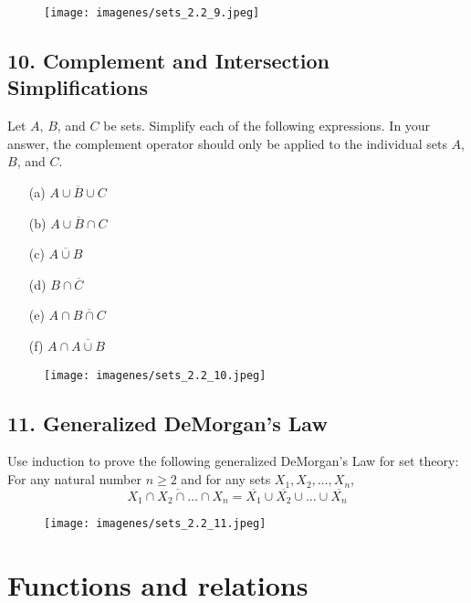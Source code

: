 \documentclass{article}
\begin{document}
\begin{figure}[H]
\centering
\texttt{[image: imagenes/sets\_2.2\_9.jpeg]}
\end{figure}


\subsection*{10. Complement and Intersection Simplifications}

Let $A$, $B$, and $C$ be sets. Simplify each of the following expressions. In your answer, the complement operator should only be applied to the individual sets $A$, $B$, and $C$.

\begin{enumerate}
    \item[(a)] $\overline{A \cup B \cup C}$
    \item[(b)] $\overline{A \cup B \cap C}$
    \item[(c)] $\overline{A \cup B}$
    \item[(d)] $B \cap \overline{C}$
    \item[(e)] $A \cap \overline{B \cap C}$
    \item[(f)] $A \cap \overline{A \cup B}$
\end{enumerate}

\begin{figure}[H]
\centering
\texttt{[image: imagenes/sets\_2.2\_10.jpeg]}
\end{figure}

\subsection*{11. Generalized DeMorgan’s Law}

Use induction to prove the following generalized DeMorgan’s Law for set theory: For any natural number $n \geq 2$ and for any sets $X_1, X_2, \dots, X_n$,
\[
\overline{X_1 \cap X_2 \cap \dots \cap X_n} = \overline{X_1} \cup \overline{X_2} \cup \dots \cup \overline{X_n}
\]

\begin{figure}[H]
\centering
\texttt{[image: imagenes/sets\_2.2\_11.jpeg]}
\end{figure}

\section{Functions and relations}
\end{document}
